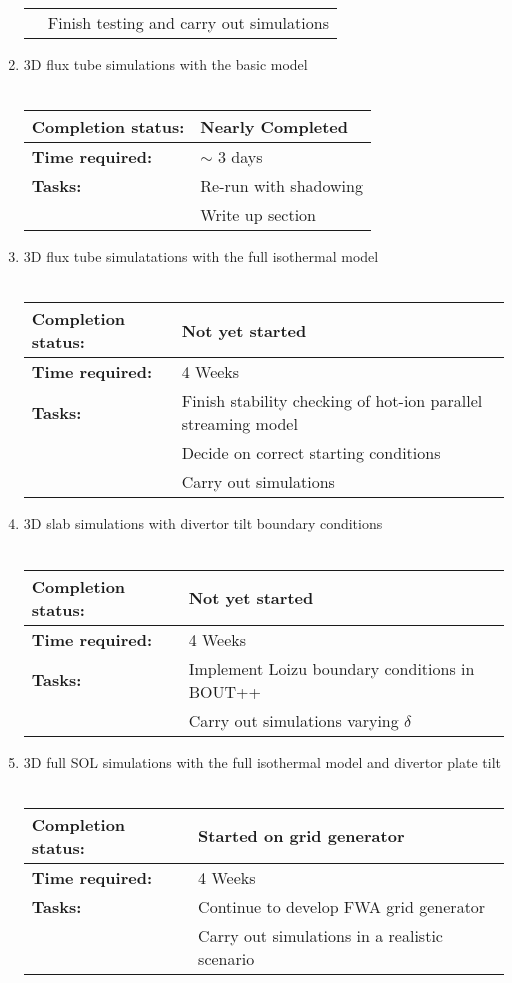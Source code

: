 \documentclass[11pt]{article}
\begin{document}
\begin{enumerate}
\begin{tabular}{l l}
 & Finish testing and carry out simulations
\end{tabular}
\item 3D flux tube simulations with the basic model\\ \\
\begin{tabular}{l l}
\hline
\textbf{Completion status:} & Nearly Completed \\
\hline
  \textbf{Time required:} & $\sim$ 3 days \\
\hline
\textbf{Tasks:} & Re-run  with shadowing\\
  &     Write up section
\end{tabular}
\item 3D flux tube simulatations with the full isothermal model\\ \\
\begin{tabular}{l l}
\hline
\textbf{Completion status:} & Not yet started \\
\hline
  \textbf{Time required:} & 4 Weeks \\
\hline
\textbf{Tasks:} & Finish stability checking of hot-ion parallel streaming model\\
 & Decide on correct starting conditions\\ 
 & Carry out simulations
\end{tabular}
\item 3D slab simulations with divertor tilt boundary conditions\\ \\
\begin{tabular}{l l}
\hline
\textbf{Completion status:} &  Not yet started \\
\hline
  \textbf{Time required:} & 4 Weeks \\
\hline
\textbf{Tasks:} & Implement Loizu boundary conditions in BOUT++\\
 & Carry out simulations varying $\delta$
\end{tabular}
\item 3D full SOL simulations with the full isothermal model and divertor plate tilt\\ \\
\begin{tabular}{l l}
\hline
\textbf{Completion status:} &  Started on grid generator \\
\hline
  \textbf{Time required:} & 4 Weeks \\
\hline
\textbf{Tasks:} & Continue to develop FWA grid generator\\
 & Carry out simulations in a realistic scenario
\end{tabular}
\end{enumerate}
\end{document}
